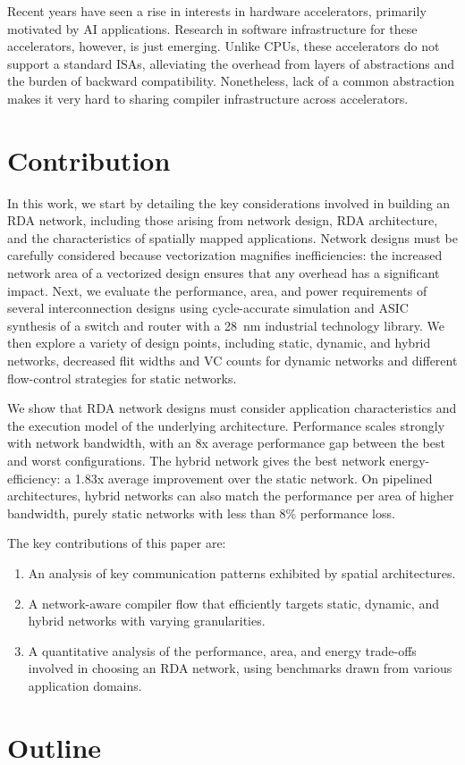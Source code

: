 Recent years have seen a rise in interests in hardware accelerators, primarily motivated by AI applications. 
Research in software infrastructure for these accelerators, however, is just emerging.
Unlike CPUs, these accelerators do not support a standard ISAs, alleviating the overhead from
layers of abstractions and the burden of backward compatibility. 
Nonetheless, lack of a common abstraction makes it very hard to sharing compiler infrastructure
across accelerators. 

\section{Contribution}

In this work, we start by detailing the key considerations involved in building an RDA network, including those arising from network design, RDA architecture, and the characteristics of spatially mapped applications.
Network designs must be carefully considered because vectorization magnifies inefficiencies: the increased network area of a vectorized design ensures that any overhead has a significant impact.
Next, we evaluate the performance, area, and power requirements of several interconnection designs using cycle-accurate simulation and ASIC synthesis of a switch and router with a \SI{28}{nm} industrial technology library.
We then explore a variety of design points, including static, dynamic, and hybrid networks, decreased flit widths and VC counts for dynamic networks and different flow-control strategies for static networks.

We show that RDA network designs must consider application characteristics and the execution model of the underlying architecture.
Performance scales strongly with network bandwidth, with an 8x average performance gap between the best and worst configurations. 
The hybrid network gives the best network energy-efficiency: a 1.83x average improvement over the static network. On pipelined architectures,
hybrid networks can also match the performance per area of higher bandwidth, purely static networks with less than 8\% performance loss.

The key contributions of this paper are:
\begin{enumerate}
    \item An analysis of key communication patterns exhibited by spatial architectures.
    \item A network-aware compiler flow that efficiently targets static, dynamic, and hybrid networks with varying granularities.
    \item A quantitative analysis of the performance, area, and energy trade-offs involved in choosing an RDA network, using benchmarks drawn from various application domains.
\end{enumerate}

\section{Outline}
